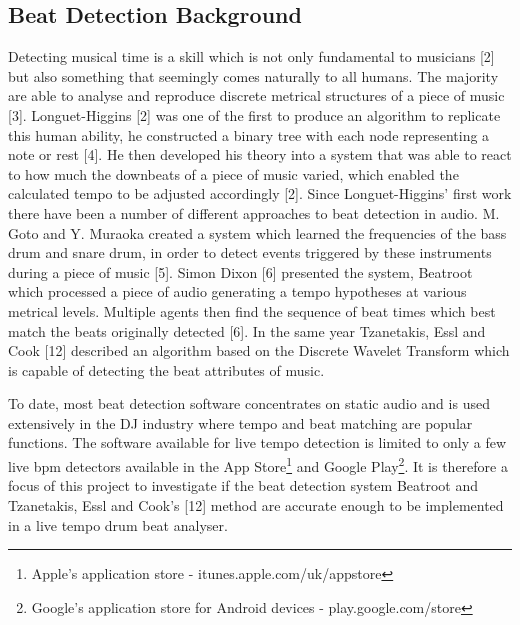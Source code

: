 \documentclass[a4paper, 11pt]{article}
\begin{document}
\subsection{Beat Detection Background}

Detecting musical time is a skill which is not only fundamental to musicians [2] but also something that seemingly comes naturally to all humans. The majority are able to analyse and reproduce discrete metrical structures of a piece of music [3]. Longuet-Higgins [2] was one of the first to produce an algorithm to replicate this human ability, he constructed a binary tree with each node representing a note or rest [4]. He then developed his theory into a system that was able to react to how much the downbeats of a piece of music varied, which enabled the calculated tempo to be adjusted accordingly [2]. Since Longuet-Higgins' first work there have been a number of different approaches to beat detection in audio. M. Goto and Y. Muraoka created a system which learned the frequencies of the bass drum and snare drum, in order to detect events triggered by these instruments during a piece of music [5]. Simon Dixon [6] presented the system, Beatroot which processed a piece of audio generating a tempo hypotheses at various metrical levels. Multiple agents then find the sequence of beat times which best match the beats originally detected [6]. In the same year Tzanetakis, Essl and Cook [12] described an algorithm based on the Discrete Wavelet Transform which is capable of detecting the beat attributes of music. 

To date, most beat detection software concentrates on static audio and is used extensively in the DJ industry where tempo and beat matching are popular functions. The software available for live tempo detection is limited to only a few live bpm detectors available in the App Store\footnote{Apple's application store - itunes.apple.com/uk/appstore‎} and Google Play\footnote{Google's application store for Android devices - play.google.com/store}. It is therefore a focus of this project to investigate if the beat detection system Beatroot and Tzanetakis, Essl and Cook's [12] method are accurate enough to be implemented in a live tempo drum beat analyser.
\end{document}
